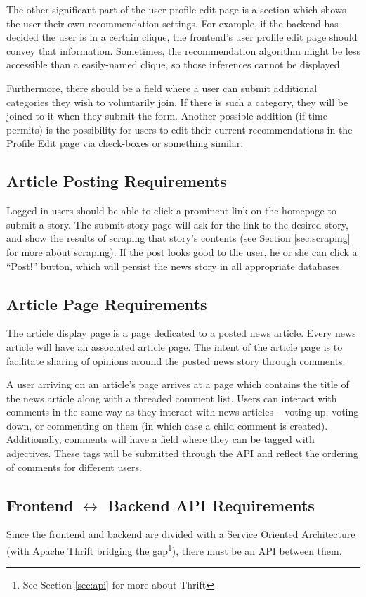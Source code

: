 \documentclass[11pt,letterpaper]{article}
\begin{document}
The other significant part of the user profile edit page is a section which shows the user their own recommendation settings.
For example, if the backend has decided the user is in a certain clique, the frontend's user profile edit page should convey that information.
Sometimes, the recommendation algorithm might be less accessible than a easily-named clique, so those inferences cannot be displayed.

Furthermore, there should be a field where a user can submit additional categories they wish to voluntarily join. If there is such a category, they will be joined to it when they submit the form. Another possible addition (if time permits) is the possibility for users to edit their current recommendations in the Profile Edit page via check-boxes or something similar.

\subsection{Article Posting Requirements}
Logged in users should be able to click a prominent link on the homepage to submit a story.
The submit story page will ask for the link to the desired story, and show the results of scraping that story's contents (see Section \ref{sec:scraping} for more about scraping).
If the post looks good to the user, he or she can click a ``Post!'' button, which will persist the news story in all appropriate databases.

\subsection{Article Page Requirements}
The article display page is a page dedicated to a posted news article. Every news article will have an associated article page.
The intent of the article page is to facilitate sharing of opinions around the posted news story through comments.

A user arriving on an article's page arrives at a page which contains the title of the news article along with a threaded comment list.
Users can interact with comments in the same way as they interact with news articles -- voting up, voting down, or commenting on them (in which case a child comment is created). Additionally, comments will have a field where they can be tagged with adjectives. These tags will be submitted through the API and reflect the ordering of comments for different users.

\subsection{Frontend $\leftrightarrow$ Backend API Requirements}
Since the frontend and backend are divided with a Service Oriented Architecture (with Apache Thrift bridging the gap\footnote{See Section \ref{sec:api} for more about Thrift}), there must be an API between them.
\end{document}
